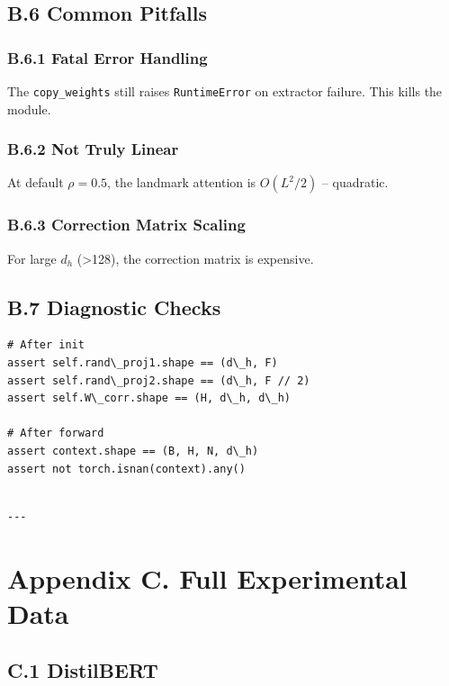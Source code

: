 \subsection{B.6 Common Pitfalls}

\subsubsection{B.6.1 Fatal Error Handling}

The \texttt{copy\_weights} still raises \texttt{RuntimeError} on extractor failure. This 
kills the module.

\subsubsection{B.6.2 Not Truly Linear}

At default $\rho = 0.5$, the landmark attention is $O(L^2/2)$ -- 
quadratic.

\subsubsection{B.6.3 Correction Matrix Scaling}

For large $d_h$ (\textgreater{}128), the correction matrix is expensive.

\subsection{B.7 Diagnostic Checks}

\begin{lstlisting}
# After init
assert self.rand\_proj1.shape == (d\_h, F)
assert self.rand\_proj2.shape == (d\_h, F // 2)
assert self.W\_corr.shape == (H, d\_h, d\_h)

# After forward
assert context.shape == (B, H, N, d\_h)
assert not torch.isnan(context).any()
\end{lstlisting}
\begin{lstlisting}

---
\end{lstlisting}

\section{Appendix C. Full Experimental Data}

\subsection{C.1 DistilBERT}

